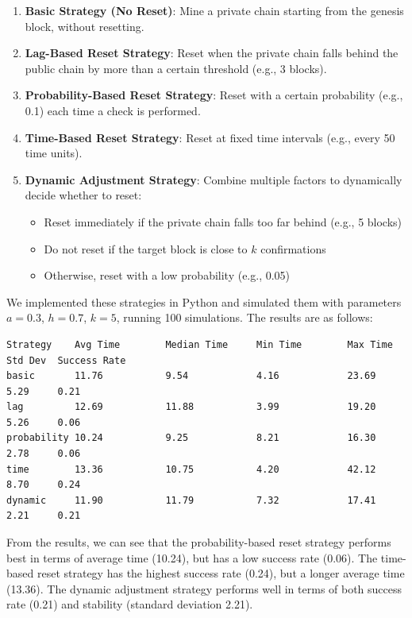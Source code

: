 \documentclass[12pt,a4paper]{article}
\begin{document}
\begin{enumerate}
    \item \textbf{Basic Strategy (No Reset)}: Mine a private chain starting from the genesis block, without resetting.
    \item \textbf{Lag-Based Reset Strategy}: Reset when the private chain falls behind the public chain by more than a certain threshold (e.g., 3 blocks).
    \item \textbf{Probability-Based Reset Strategy}: Reset with a certain probability (e.g., 0.1) each time a check is performed.
    \item \textbf{Time-Based Reset Strategy}: Reset at fixed time intervals (e.g., every 50 time units).
    \item \textbf{Dynamic Adjustment Strategy}: Combine multiple factors to dynamically decide whether to reset:
        \begin{itemize}
            \item Reset immediately if the private chain falls too far behind (e.g., 5 blocks)
            \item Do not reset if the target block is close to $k$ confirmations
            \item Otherwise, reset with a low probability (e.g., 0.05)
        \end{itemize}
\end{enumerate}

We implemented these strategies in Python and simulated them with parameters $a = 0.3$, $h = 0.7$, $k = 5$, running 100 simulations. The results are as follows:

\begin{verbatim}
Strategy    Avg Time        Median Time     Min Time        Max Time        Std Dev  Success Rate
basic       11.76           9.54            4.16            23.69           5.29     0.21
lag         12.69           11.88           3.99            19.20           5.26     0.06
probability 10.24           9.25            8.21            16.30           2.78     0.06
time        13.36           10.75           4.20            42.12           8.70     0.24
dynamic     11.90           11.79           7.32            17.41           2.21     0.21
\end{verbatim}

From the results, we can see that the probability-based reset strategy performs best in terms of average time (10.24), but has a low success rate (0.06). The time-based reset strategy has the highest success rate (0.24), but a longer average time (13.36). The dynamic adjustment strategy performs well in terms of both success rate (0.21) and stability (standard deviation 2.21).
\end{document}
